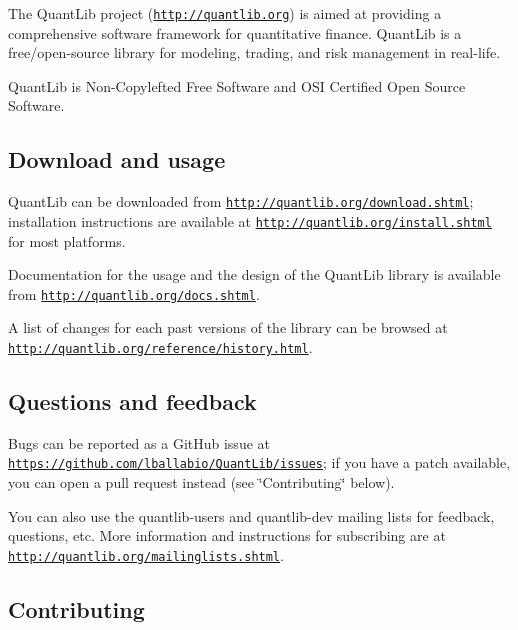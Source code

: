 The Quant\+Lib project (\href{http://quantlib.org}{\tt http\+://quantlib.\+org}) is aimed at providing a comprehensive software framework for quantitative finance. Quant\+Lib is a free/open-\/source library for modeling, trading, and risk management in real-\/life.

Quant\+Lib is Non-\/\+Copylefted Free Software and O\+SI Certified Open Source Software.

\subsection*{Download and usage }

Quant\+Lib can be downloaded from \href{http://quantlib.org/download.shtml}{\tt http\+://quantlib.\+org/download.\+shtml}; installation instructions are available at \href{http://quantlib.org/install.shtml}{\tt http\+://quantlib.\+org/install.\+shtml} for most platforms.

Documentation for the usage and the design of the Quant\+Lib library is available from \href{http://quantlib.org/docs.shtml}{\tt http\+://quantlib.\+org/docs.\+shtml}.

A list of changes for each past versions of the library can be browsed at \href{http://quantlib.org/reference/history.html}{\tt http\+://quantlib.\+org/reference/history.\+html}.

\subsection*{Questions and feedback }

Bugs can be reported as a Git\+Hub issue at \href{https://github.com/lballabio/QuantLib/issues}{\tt https\+://github.\+com/lballabio/\+Quant\+Lib/issues}; if you have a patch available, you can open a pull request instead (see \char`\"{}\+Contributing\char`\"{} below).

You can also use the {\ttfamily quantlib-\/users} and {\ttfamily quantlib-\/dev} mailing lists for feedback, questions, etc. More information and instructions for subscribing are at \href{http://quantlib.org/mailinglists.shtml}{\tt http\+://quantlib.\+org/mailinglists.\+shtml}.

\subsection*{Contributing }


